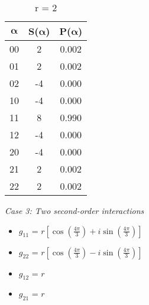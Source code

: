 \begin{table}[h]
    \begin{subtable}{.3\textwidth}
        \centering
        \caption{r = 2}
        \begin{tabular}{ccc}
            \toprule
             $\boldsymbol{\alpha}$ & S($\boldsymbol{\alpha}$) & P($\boldsymbol{\alpha}$)\\
            \midrule
            00 & 2 & 0.002 \\
            01 & 2 & 0.002 \\
            02 & -4 & 0.000 \\
            10 & -4 & 0.000 \\
            11 & 8 & 0.990 \\
            12 & -4 & 0.000 \\
            20 & -4 & 0.000 \\
            21 & 2 & 0.002 \\
            22 & 2 & 0.002 \\
          \bottomrule
        \end{tabular}
    \end{subtable}
\end{table}

\noindent
\textit{Case 3: Two second-order interactions}

\begin{itemize}
    \item $g_{11}$ = $r\left[\cos\left( \frac{4\pi}{3}\right) + i \sin\left( \frac{4\pi}{3}\right)\right]$
    \item $g_{22}$ = $r\left[\cos\left( \frac{4\pi}{3}\right) - i \sin\left( \frac{4\pi}{3}\right)\right]$
    \item $g_{12}$ = $r$
    \item $g_{21}$ = $r$
\end{itemize}

